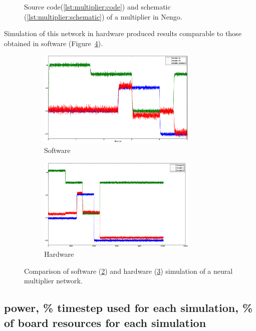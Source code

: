\documentclass[english]{article}
\begin{document}
\begin{figure}
\caption[A multiplier in Nengo.]
{Source code(\ref{lst:multiplier:code}) and schematic (\ref{lst:multiplier:schematic})
of a multiplier in Nengo.}
\label{lst:multiplier}
\end{figure}


Simulation of this network in hardware produced results comparable to those obtained in software
(Figure~\ref{fig:multiplier}).

\begin{figure}
\centering


\begin{subfigure}[b]{0.5\textwidth}
\centering
\includegraphics[width=3in]{multiplier-sw.eps}
\caption{Software}
\label{fig:multiplier:sw}
\end{subfigure}

\begin{subfigure}[b]{0.5\textwidth}
\centering
\includegraphics[width=3in]{multiplier.eps}
\caption{Hardware}
\label{fig:multiplier:hw}
\end{subfigure}

\caption[Multiplier simulation comparison.]
{Comparison of software (\ref{fig:multiplier:sw}) and hardware (\ref{fig:multiplier:hw})
simulation of a neural multiplier network.}
\label{fig:multiplier}
\end{figure}

\subsection{power, \% timestep used for each simulation, \% of board resources for each simulation}
\end{document}
